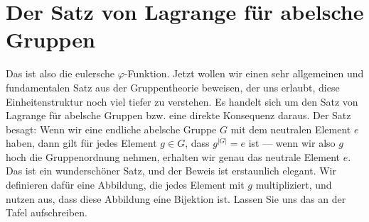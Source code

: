 \begin{math-stroke}

\end{math-stroke}

\section{Der Satz von Lagrange für abelsche Gruppen}

\begin{spoken-clean}[00:38:56 - 00:41:36]
Das ist also die eulersche $\varphi$-Funktion. Jetzt wollen wir einen sehr allgemeinen und fundamentalen Satz aus der Gruppentheorie beweisen, der uns erlaubt, diese Einheitenstruktur noch viel tiefer zu verstehen. Es handelt sich um den Satz von Lagrange für abelsche Gruppen bzw. eine direkte Konsequenz daraus. Der Satz besagt: Wenn wir eine endliche abelsche Gruppe $G$ mit dem neutralen Element $e$ haben, dann gilt für jedes Element $g \in G$, dass $g^{|G|} = e$ ist --- wenn wir also $g$ hoch die Gruppenordnung nehmen, erhalten wir genau das neutrale Element $e$. Das ist ein wunderschöner Satz, und der Beweis ist erstaunlich elegant. Wir definieren dafür eine Abbildung, die jedes Element mit $g$ multipliziert, und nutzen aus, dass diese Abbildung eine Bijektion ist. Lassen Sie uns das an der Tafel aufschreiben.
\end{spoken-clean}


